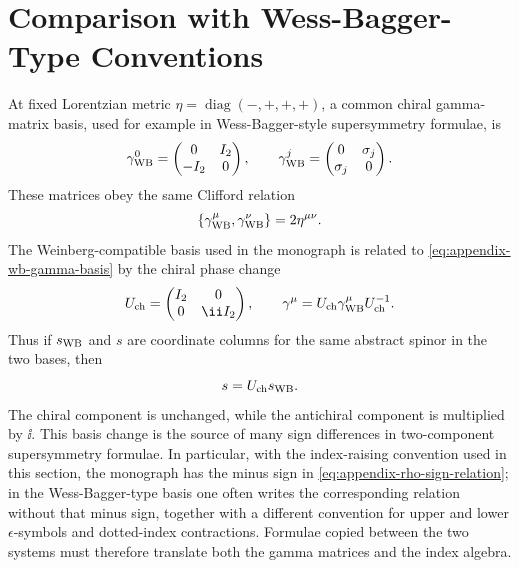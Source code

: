 \section{Comparison with Wess-Bagger-Type Conventions}

At fixed Lorentzian metric \(\eta=\operatorname{diag}(-,+,+,+)\), a common
chiral gamma-matrix basis, used for example in Wess-Bagger-style supersymmetry
formulae, is
\begin{equation}
  \gamma^0_{\rm WB}
  =
  \begin{pmatrix}
    0&I_2\\ -I_2&0
  \end{pmatrix},
  \qquad
  \gamma^j_{\rm WB}
  =
  \begin{pmatrix}
    0&\sigma_j\\ \sigma_j&0
  \end{pmatrix}.
  \label{eq:appendix-wb-gamma-basis}
\end{equation}
These matrices obey the same Clifford relation
\[
  \{\gamma^\mu_{\rm WB},\gamma^\nu_{\rm WB}\}=2\eta^{\mu\nu}.
\]
The Weinberg-compatible basis used in the monograph is related to
\eqref{eq:appendix-wb-gamma-basis} by the chiral phase change
\begin{equation}
  U_{\rm ch}
  =
  \begin{pmatrix}
    I_2&0\\0&\ii I_2
  \end{pmatrix},
  \qquad
  \gamma^\mu=U_{\rm ch}\gamma^\mu_{\rm WB}U_{\rm ch}^{-1}.
  \label{eq:appendix-wb-phase-change}
\end{equation}
Thus if \(s_{\rm WB}\) and \(s\) are coordinate columns for the same abstract
spinor in the two bases, then
\[
  s=U_{\rm ch}s_{\rm WB}.
\]
The chiral component is unchanged, while the antichiral component is
multiplied by \(\ii\).  This basis change is the source of many sign
differences in two-component supersymmetry formulae.  In particular, with the
index-raising convention used in this section, the monograph has the minus
sign in \eqref{eq:appendix-rho-sign-relation}; in the
Wess-Bagger-type basis one often writes the corresponding relation without
that minus sign, together with a different convention for upper and lower
\(\epsilon\)-symbols and dotted-index contractions.  Formulae copied between
the two systems must therefore translate both the gamma matrices and the
index algebra.

